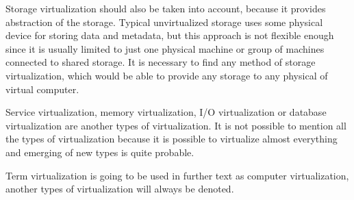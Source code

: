 Storage virtualization should also be taken into account, because it provides abstraction of the storage. Typical unvirtualized storage uses some physical device for storing data and metadata, but this approach is not flexible enough since it is usually limited to just one physical machine or group of machines connected to shared storage. It is necessary to find any method of storage virtualization, which would be able to provide any storage to any physical of virtual computer.

Service virtualization, memory virtualization, I/O virtualization or database virtualization are another types of virtualization. It is not possible to mention all the types of virtualization because it is possible to virtualize almost everything and emerging of new types is quite probable. 

Term virtualization is going to be used in further text as computer virtualization, another types of virtualization will always be denoted.
